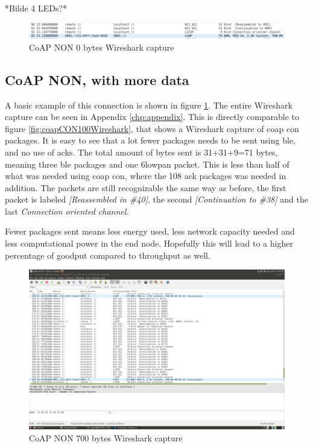 *Bilde 4 LEDs?*


\begin{figure}[ht]
    \centering
    \includegraphics[scale=0.40]{coapNON0Bytes_PartOfWireshark.png}    
    \caption{CoAP NON 0 bytes Wireshark capture}
    \label{fig:NON0bytesPartOfWireshark}
\end{figure}

\subsection{CoAP NON, with more data}

A basic example of this connection is shown in figure \ref{fig:NON0bytesPartOfWireshark}. The entire Wireshark capture can be seen in Appendix \ref{chp:appendix}. This is directly comparable to figure \ref{fig:coapCON100Wireshark}, that shows a Wireshark capture of \gls{coap} \gls{con} packages. It is easy to see that a lot fewer packages needs to be sent using \gls{ble}, and no use of \glspl{ack}. The total amount of bytes sent is 31+31+9=71 bytes, meaning three \gls{ble} packages and one \gls{6lowpan} packet. This is less than half of what was needed using \gls{coap} \gls{con}, where the 108 \gls{ack} packages was needed in addition. The packets are still recognizable the same way as before, the first packet is labeled \textit{[Reassembled in \#40]}, the second \textit{[Continuation to \#38]} and the last \textit{Connection oriented channel}.

Fewer packages sent means less energy used, less network capacity needed and less computational power in the end node. Hopefully this will lead to a higher percentage of goodput compared to throughput as well. 


\begin{figure}[ht]
    \centering
    \includegraphics[scale=0.40]{rsz_1coapnon_wireshark700fullscreen.png}    
    \caption{CoAP NON 700 bytes Wireshark capture}
    \label{fig:NON7000bytesFullWireshark}
\end{figure}


